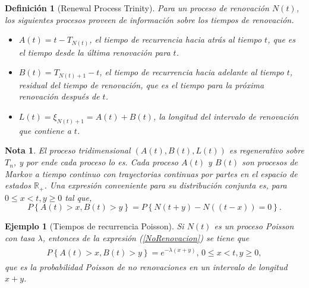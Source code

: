 \documentclass{article}
\newtheorem{Def}{Definición}[section]
\newtheorem{Ejem}{Ejemplo}[section]
\newtheorem{Note}{Nota}[section]
\newcommand{\rea}{\mathbb{R}}
\numberwithin{equation}{section}
\begin{document}
\begin{Def}[Renewal Process Trinity]
Para un proceso de renovaci\'on $N\left(t\right)$, los siguientes procesos proveen de informaci\'on sobre los tiempos de renovaci\'on.
\begin{itemize}
\item $A\left(t\right)=t-T_{N\left(t\right)}$, el tiempo de recurrencia hacia atr\'as al tiempo $t$, que es el tiempo desde la \'ultima renovaci\'on para $t$.

\item $B\left(t\right)=T_{N\left(t\right)+1}-t$, el tiempo de recurrencia hacia adelante al tiempo $t$, residual del tiempo de renovaci\'on, que es el tiempo para la pr\'oxima renovaci\'on despu\'es de $t$.

\item $L\left(t\right)=\xi_{N\left(t\right)+1}=A\left(t\right)+B\left(t\right)$, la longitud del intervalo de renovaci\'on que contiene a $t$.
\end{itemize}
\end{Def}

\begin{Note}
El proceso tridimensional $\left(A\left(t\right),B\left(t\right),L\left(t\right)\right)$ es regenerativo sobre $T_{n}$, y por ende cada proceso lo es. Cada proceso $A\left(t\right)$ y $B\left(t\right)$ son procesos de Markov a tiempo continuo con trayectorias continuas por partes en el espacio de estados $\rea_{+}$. Una expresi\'on conveniente para su distribuci\'on conjunta es, para $0\leq x<t,y\geq0$ tal que,
\begin{equation}\label{NoRenovacion}
P\left\{A\left(t\right)>x,B\left(t\right)>y\right\}=
P\left\{N\left(t+y\right)-N\left((t-x)\right)=0\right\}.
\end{equation}
\end{Note}

\begin{Ejem}[Tiempos de recurrencia Poisson]
Si $N\left(t\right)$ es un proceso Poisson con tasa $\lambda$, entonces de la expresi\'on (\ref{NoRenovacion}) se tiene que
\begin{eqnarray*}
\begin{array}{l}
P\left\{A\left(t\right)>x,B\left(t\right)>y\right\}=e^{-\lambda\left(x+y\right)}\textrm{, }0\leq x<t,y\geq0,
\end{array}
\end{eqnarray*}
que es la probabilidad Poisson de no renovaciones en un intervalo de longitud $x+y$.
\end{Ejem}
\end{document}
